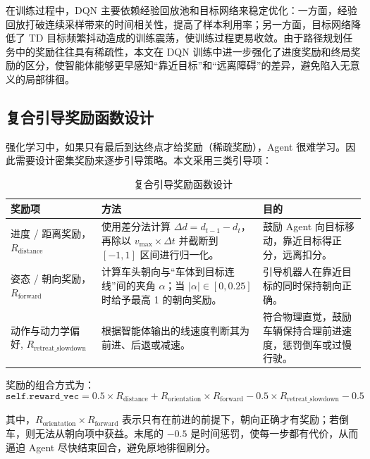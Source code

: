 在训练过程中，DQN 主要依赖经验回放池和目标网络来稳定优化：一方面，经验回放打破连续采样带来的时间相关性，提高了样本利用率；另一方面，目标网络降低了 TD 目标频繁抖动造成的训练震荡，使训练过程更易收敛\cite{XTYY202507002}。由于路径规划任务中的奖励往往具有稀疏性，本文在 DQN 训练中进一步强化了进度奖励和终局奖励的区分，使智能体能够更早感知“靠近目标”和“远离障碍”的差异，避免陷入无意义的局部徘徊。

\subsection{复合引导奖励函数设计}
强化学习中，如果只有最后到达终点才给奖励（稀疏奖励），Agent 很难学习。因此需要设计密集奖励来逐步引导策略。本文采用三类引导项：

\begin{table}[H]
    \centering
    \caption{复合引导奖励函数设计}
    \label{tab:reward_design}
    \begin{tabular}{p{}p{}p{}}
        \toprule
        \textbf{奖励项} & \textbf{方法} & \textbf{目的} \\
        \midrule
        进度 / 距离奖励，$R_{\mathrm{distance}}$  & 使用差分法计算 $\Delta d = d_{t-1} - d_t$，再除以 $v_{\max} \times \Delta t$ 并截断到 $[-1,1]$ 区间进行归一化。 & 鼓励 Agent 向目标移动，靠近目标得正分，远离扣分。 \\
        姿态 / 朝向奖励，$R_{\mathrm{forward}}$  & 计算车头朝向与“车体到目标连线”间的夹角 $\alpha$；当 $|\alpha|\in[0,0.25]$ 时给予最高 1 的朝向奖励。 & 引导机器人在靠近目标的同时保持朝向正确。 \\
        动作与动力学偏好, $R_{\mathrm{retreat\_slowdown}}$ & 根据智能体输出的线速度判断其为前进、后退或减速。 & 符合物理直觉，鼓励车辆保持合理前进速度，惩罚倒车或过慢行驶。 \\
        \bottomrule
    \end{tabular}
\end{table}
奖励的组合方式为：
\begin{equation}
    \texttt{self.reward\_vec} = 0.5 \times R_{\mathrm{distance}} + R_{\mathrm{orientation}} \times R_{\mathrm{forward}} - 0.5 \times R_{\mathrm{retreat\_slowdown}} - 0.5
\end{equation}

其中，$R_{\mathrm{orientation}} \times R_{\mathrm{forward}}$ 表示只有在前进的前提下，朝向正确才有奖励；若倒车，则无法从朝向项中获益。末尾的 $-0.5$ 是时间惩罚，使每一步都有代价，从而逼迫 Agent 尽快结束回合，避免原地徘徊刷分\cite{DWA}。

